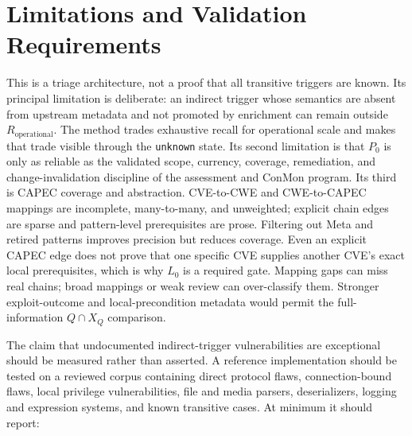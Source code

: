 \documentclass[11pt]{article}
\newcommand{\code}[1]{\texttt{#1}}
\begin{document}
\section{Limitations and Validation Requirements}
\label{sec:limitations}
This is a triage architecture, not a proof that all transitive triggers are
known. Its principal limitation is deliberate: an indirect trigger whose
semantics are absent from upstream metadata and not promoted by enrichment can
remain outside $R_{\mathrm{operational}}$. The method trades exhaustive recall
for operational scale and makes that trade visible through the \code{unknown}
state. Its second limitation is that $P_0$ is only as reliable as the validated
scope, currency, coverage, remediation, and change-invalidation discipline of
the assessment and ConMon program. Its third is CAPEC coverage and abstraction.
CVE-to-CWE and CWE-to-CAPEC mappings are incomplete, many-to-many, and
unweighted; explicit chain edges are sparse and pattern-level prerequisites are
prose. Filtering out Meta and retired patterns improves precision but reduces
coverage. Even an explicit CAPEC edge does not prove that one specific CVE
supplies another CVE's exact local prerequisites, which is why $L_0$ is a
required gate. Mapping gaps can miss real chains; broad mappings or weak review
can over-classify them. Stronger exploit-outcome and local-precondition metadata
would permit the full-information $Q\cap X_Q$ comparison.

The claim that undocumented indirect-trigger vulnerabilities are exceptional
should be measured rather than asserted. A reference implementation should be
tested on a reviewed corpus containing direct protocol flaws, connection-bound
flaws, local privilege vulnerabilities, file and media parsers, deserializers,
logging and expression systems, and known transitive cases. At minimum it
should report:
\end{document}
